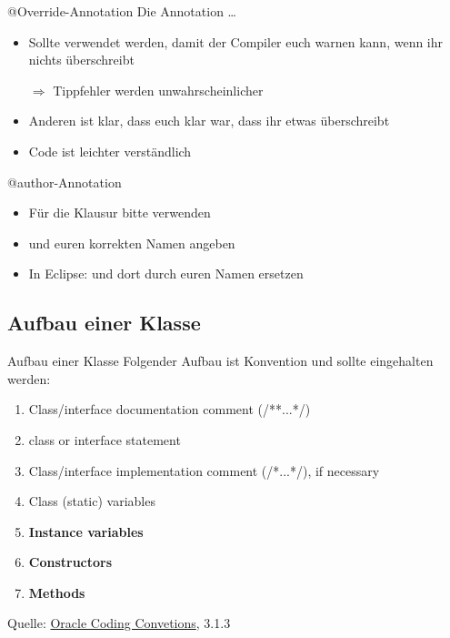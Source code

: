 \documentclass[usepdftitle=false,hyperref={pdfpagelabels=false}]{beamer}
\begin{document}
\begin{frame}{@Override-Annotation}
    Die Annotation  \dots
    \begin{itemize}[<+->]
        \item Sollte verwendet werden, damit der Compiler euch warnen
              kann, wenn ihr nichts überschreibt 
        \item[$\Rightarrow$] Tippfehler werden unwahrscheinlicher
        \item Anderen ist klar, dass euch klar war, dass ihr etwas
              überschreibt
        \item Code ist leichter verständlich
    \end{itemize}
\end{frame}

\begin{frame}{@author-Annotation}
    \begin{itemize}
        \item Für die Klausur bitte  verwenden
        \item und euren korrekten Namen angeben
        \item In Eclipse: 
              und dort  durch euren Namen ersetzen
    \end{itemize}
\end{frame}

\subsection{Aufbau einer Klasse}
\begin{frame}{Aufbau einer Klasse}
    Folgender Aufbau ist Konvention und sollte eingehalten werden:
    \begin{enumerate}
        \item Class/interface documentation comment (/**...*/)
        \item class or interface statement
        \item Class/interface implementation comment (/*...*/), if necessary
        \item Class (static) variables
        \item \textbf{Instance variables}
        \item \textbf{Constructors}
        \item \textbf{Methods}
    \end{enumerate}
    Quelle: \href{http://www.oracle.com/technetwork/java/codeconventions-150003.pdf}{Oracle Coding Convetions}, 3.1.3
\end{frame}
\end{document}
